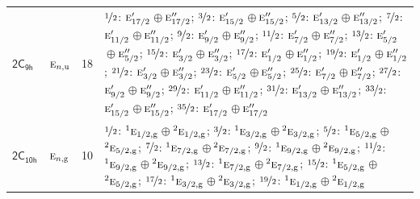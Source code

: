 \documentclass[10pt,a4paper]{article}
\numberwithin{equation}{section}
\newcommand{\grp}[1]{\mathsf{#1}}
\newcommand{\irr}[1]{\text{\normalfont\scshape #1}}
\newcommand{\conjpair}[1]{{}^{#1}}
\newcommand{\ptag}[1]{\mathrm{#1}}
\newlength{\fillwidth}\newlength{\cellwidth}\newlength{\colwidth}
\begin{document}
{\begin{longtable}{@{}llr>{\RaggedRight\arraybackslash}p{\fillwidth}@{}}
\href{2C9h.pdf}{$\grp{2C_{9h}}$} & $\irr{e}_{n,\ptag{u}}$ & 18 & $\nicefrac{1}{2}$: $\irr{e}_{17/2}'$${}\oplus{}$$\irr{e}_{17/2}''$; $\nicefrac{3}{2}$: $\irr{e}_{15/2}'$${}\oplus{}$$\irr{e}_{15/2}''$; $\nicefrac{5}{2}$: $\irr{e}_{13/2}'$${}\oplus{}$$\irr{e}_{13/2}''$; $\nicefrac{7}{2}$: $\irr{e}_{11/2}'$${}\oplus{}$$\irr{e}_{11/2}''$; $\nicefrac{9}{2}$: $\irr{e}_{9/2}'$${}\oplus{}$$\irr{e}_{9/2}''$; $\nicefrac{11}{2}$: $\irr{e}_{7/2}'$${}\oplus{}$$\irr{e}_{7/2}''$; $\nicefrac{13}{2}$: $\irr{e}_{5/2}'$${}\oplus{}$$\irr{e}_{5/2}''$; $\nicefrac{15}{2}$: $\irr{e}_{3/2}'$${}\oplus{}$$\irr{e}_{3/2}''$; $\nicefrac{17}{2}$: $\irr{e}_{1/2}'$${}\oplus{}$$\irr{e}_{1/2}''$; $\nicefrac{19}{2}$: $\irr{e}_{1/2}'$${}\oplus{}$$\irr{e}_{1/2}''$; $\nicefrac{21}{2}$: $\irr{e}_{3/2}'$${}\oplus{}$$\irr{e}_{3/2}''$; $\nicefrac{23}{2}$: $\irr{e}_{5/2}'$${}\oplus{}$$\irr{e}_{5/2}''$; $\nicefrac{25}{2}$: $\irr{e}_{7/2}'$${}\oplus{}$$\irr{e}_{7/2}''$; $\nicefrac{27}{2}$: $\irr{e}_{9/2}'$${}\oplus{}$$\irr{e}_{9/2}''$; $\nicefrac{29}{2}$: $\irr{e}_{11/2}'$${}\oplus{}$$\irr{e}_{11/2}''$; $\nicefrac{31}{2}$: $\irr{e}_{13/2}'$${}\oplus{}$$\irr{e}_{13/2}''$; $\nicefrac{33}{2}$: $\irr{e}_{15/2}'$${}\oplus{}$$\irr{e}_{15/2}''$; $\nicefrac{35}{2}$: $\irr{e}_{17/2}'$${}\oplus{}$$\irr{e}_{17/2}''$\\
\href{2C10h.pdf}{$\grp{2C_{10h}}$} & $\irr{e}_{n,\ptag{g}}$ & 10 & $\nicefrac{1}{2}$: $\conjpair{1}\irr{e}_{1/2,\ptag{g}}$${}\oplus{}$$\conjpair{2}\irr{e}_{1/2,\ptag{g}}$; $\nicefrac{3}{2}$: $\conjpair{1}\irr{e}_{3/2,\ptag{g}}$${}\oplus{}$$\conjpair{2}\irr{e}_{3/2,\ptag{g}}$; $\nicefrac{5}{2}$: $\conjpair{1}\irr{e}_{5/2,\ptag{g}}$${}\oplus{}$$\conjpair{2}\irr{e}_{5/2,\ptag{g}}$; $\nicefrac{7}{2}$: $\conjpair{1}\irr{e}_{7/2,\ptag{g}}$${}\oplus{}$$\conjpair{2}\irr{e}_{7/2,\ptag{g}}$; $\nicefrac{9}{2}$: $\conjpair{1}\irr{e}_{9/2,\ptag{g}}$${}\oplus{}$$\conjpair{2}\irr{e}_{9/2,\ptag{g}}$; $\nicefrac{11}{2}$: $\conjpair{1}\irr{e}_{9/2,\ptag{g}}$${}\oplus{}$$\conjpair{2}\irr{e}_{9/2,\ptag{g}}$; $\nicefrac{13}{2}$: $\conjpair{1}\irr{e}_{7/2,\ptag{g}}$${}\oplus{}$$\conjpair{2}\irr{e}_{7/2,\ptag{g}}$; $\nicefrac{15}{2}$: $\conjpair{1}\irr{e}_{5/2,\ptag{g}}$${}\oplus{}$$\conjpair{2}\irr{e}_{5/2,\ptag{g}}$; $\nicefrac{17}{2}$: $\conjpair{1}\irr{e}_{3/2,\ptag{g}}$${}\oplus{}$$\conjpair{2}\irr{e}_{3/2,\ptag{g}}$; $\nicefrac{19}{2}$: $\conjpair{1}\irr{e}_{1/2,\ptag{g}}$${}\oplus{}$$\conjpair{2}\irr{e}_{1/2,\ptag{g}}$\\

\end{longtable}}
\end{document}
